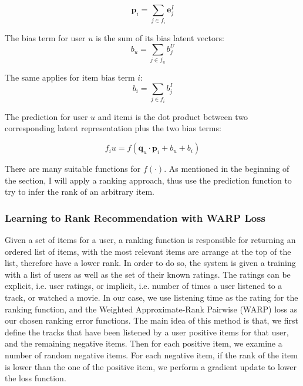 \begin{displaymath}
\boldsymbol{p}_i = \sum_{j \in f_i} \boldsymbol{e}_j^I
\end{displaymath}

\noindent The bias term for user \(u\) is the sum of its bias latent vectors:
\begin{displaymath}
b_u = \sum_{j \in f_u} b_j^U
\end{displaymath}

\noindent The same applies for item bias term \(i\):
\begin{displaymath}
b_i = \sum_{j \in f_i} b_j^I
\end{displaymath}

The prediction for user \(u\) and item\(i\) is the dot product between two corresponding latent representation plus the two bias terms:

\begin{displaymath}
f_{i}u = f (\boldsymbol{q}_u  \cdot \boldsymbol{p}_i + b_u + b_i) \tag{2} \label{eq:2}
\end{displaymath}

There are many suitable functions for  \( f(\cdot)\). As mentioned in the beginning of the section, I will apply a ranking approach, thus use the prediction function to try to infer the rank of an arbitrary item. 

\subsubsection{Learning to Rank Recommendation with WARP Loss}
Given a set of items for a user, a ranking function is responsible for returning an ordered list of items, with the most relevant items are arrange at the top of the list, therefore have a lower rank. In order to do so, the system is given a training with a list of users as well as the set of their known ratings. The ratings can be explicit, i.e. user ratings, or implicit, i.e. number of times a user listened to a track, or watched a movie. In our case, we use listening time as the rating for the ranking function, and the Weighted Approximate-Rank Pairwise (WARP) loss \cite{weston2011wsabie} as our chosen ranking error functions. The main idea of this method is that, we first define the tracks that have been listened by a user positive items for that user, and the remaining negative items. Then for each positive item, we examine a number of random negative items. For each negative item, if the rank of the item is lower than the one of the positive item, we perform a gradient update to lower the loss function. \hfill \break

